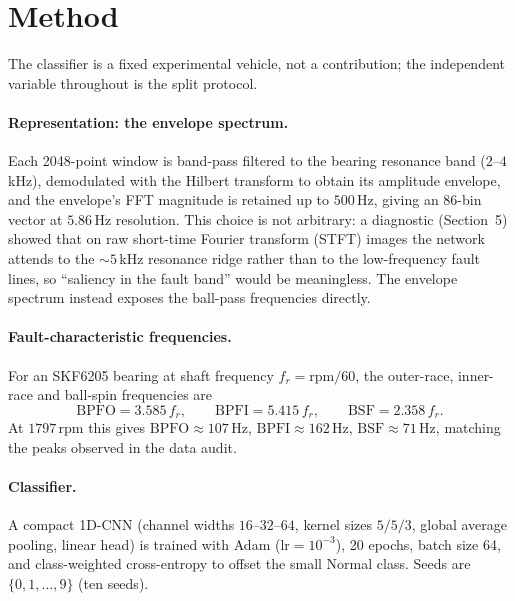\documentclass[11pt]{article}
\begin{document}
\section{Method}
The classifier is a fixed experimental vehicle, not a contribution; the independent
variable throughout is the split protocol.

\paragraph{Representation: the envelope spectrum.}
Each 2048-point window is band-pass filtered to the bearing resonance band
($2$--$4$\,kHz), demodulated with the Hilbert transform to obtain its amplitude envelope,
and the envelope's FFT magnitude is retained up to $500$\,Hz, giving an 86-bin vector at
$5.86$\,Hz resolution. This choice is not arbitrary: a diagnostic (Section~5) showed that
on raw short-time Fourier transform (STFT) images the network attends to the $\sim5$\,kHz
resonance ridge rather than to the low-frequency fault lines, so ``saliency in the fault
band'' would be meaningless. The envelope spectrum instead exposes the ball-pass
frequencies directly.

\paragraph{Fault-characteristic frequencies.}
For an SKF6205 bearing at shaft frequency $f_r = \mathrm{rpm}/60$, the outer-race,
inner-race and ball-spin frequencies are
\begin{equation}
\mathrm{BPFO} = 3.585\,f_r,\qquad
\mathrm{BPFI} = 5.415\,f_r,\qquad
\mathrm{BSF}  = 2.358\,f_r .
\end{equation}
At $1797$\,rpm this gives $\mathrm{BPFO}\approx107$\,Hz, $\mathrm{BPFI}\approx162$\,Hz,
$\mathrm{BSF}\approx71$\,Hz, matching the peaks observed in the data audit.

\paragraph{Classifier.}
A compact 1D-CNN (channel widths $16$--$32$--$64$, kernel sizes $5/5/3$, global average
pooling, linear head) is trained with Adam ($\text{lr}=10^{-3}$), 20 epochs, batch size
64, and class-weighted cross-entropy to offset the small Normal class. Seeds are
$\{0,1,\dots,9\}$ (ten seeds).
\end{document}
